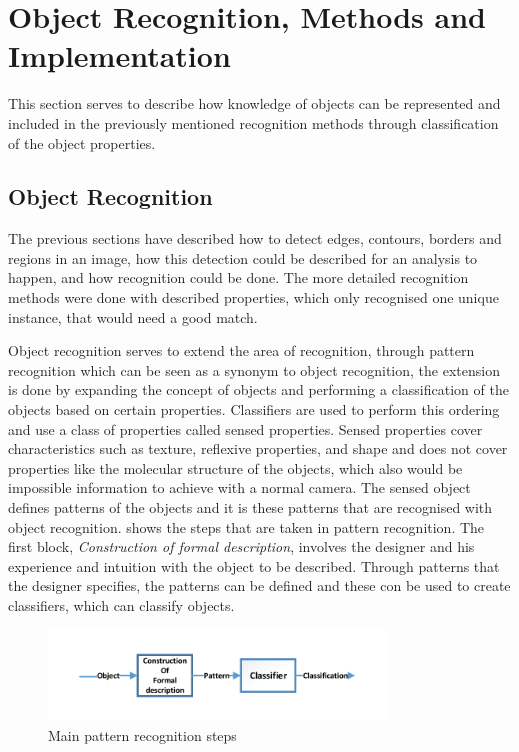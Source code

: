 \section{Object Recognition, Methods and Implementation}\label{sc:obj_final}
This section serves to describe how knowledge of objects can be represented and included in the previously mentioned recognition methods through classification of the object properties.

\subsection{Object Recognition}\label{ssc:object_recognition}
The previous sections have described how to detect edges, contours, borders and regions in an image, how this detection could be described for an analysis to happen, and how recognition could be done. The more detailed recognition methods were done with described properties, which only recognised one unique instance, that would need a good match.

Object recognition serves to extend the area of recognition, through pattern recognition which can be seen as a synonym to object recognition, the extension is done by expanding the concept of objects and performing a classification of the objects based on certain properties. Classifiers are used to perform this ordering and use a class of properties called sensed properties. Sensed properties cover characteristics such as texture, reflexive properties, and shape and does not cover properties like the molecular structure of the objects, which also would be impossible information to achieve with a normal camera. The sensed object defines patterns of the objects and it is these patterns that are recognised with object recognition.  shows the steps that are taken in pattern recognition. The first block, \textit{Construction of formal description}, involves the designer and his experience and intuition with the object to be described. Through patterns that the designer specifies, the patterns can be defined and these con be used to create classifiers, which can classify objects.
\begin{figure}[H]\centering
  \includegraphics[width=0.8\textwidth]{graphics/pattern_recognition.pdf}
  \caption{Main pattern recognition steps \citep{obj_recogn_book}}
  \label{fig:pat_recog}
\end{figure}

